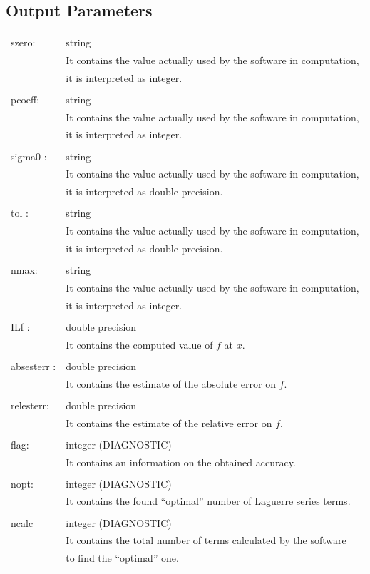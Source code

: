\documentclass[10pt]{article}
\begin{document}
\subsection{Output Parameters}

\begin{center}

\begin{longtable}{ll}
szero:	&	string \\
&It contains the value actually used by the software in computation, \\&it is interpreted as integer.\\
&\\
pcoeff:	&	string\\
&It contains the value actually used by the software in computation, \\&it is interpreted as integer.\\
&\\
sigma0 :&	 string\\
&It contains the value actually used by the software in computation, \\&it is interpreted as double precision.\\
&\\
tol :    &      	string\\
&It contains the value actually used by the software in computation, \\&it is interpreted as double precision.\\
&\\
nmax:	&	string\\
&It contains the value actually used by the software in computation, \\&it is interpreted as integer.\\
&\\
ILf :	&	double precision \\
&It contains the computed value of $f$ at $x$.\\
&\\
absesterr : 	&double precision\\
&It contains the estimate of the absolute error on $f$.\\
&\\
relesterr: &  	double precision \\
&It contains the estimate of the relative error on $f$.\\
&\\
flag: &       	integer  (DIAGNOSTIC) \\
&It contains an information on the obtained accuracy.\\
&\\
nopt:  &      	integer (DIAGNOSTIC) \\
&It contains the found ``optimal'' number of Laguerre series terms.\\
&\\
ncalc&	integer (DIAGNOSTIC)\\
&It contains the total number of terms calculated by the software \\
& to find the ``optimal'' one.

 \end{longtable} \end{center}
\end{document}
